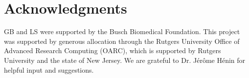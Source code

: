 
%



\section*{Acknowledgments}
GB and LS were supported by the Busch Biomedical Foundation. This project was supported by generous allocation through the Rutgers University Office of Advanced Research Computing (OARC), which is supported by Rutgers University and the state of New Jersey. We are grateful to Dr. J{\'{e}}r{\^{o}}me H{\'{e}}nin for helpful input and suggestions.

